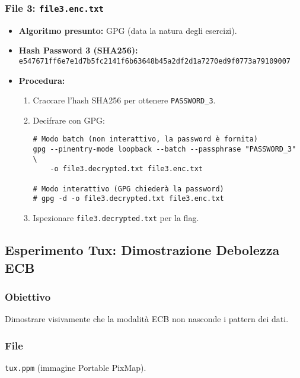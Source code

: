 \subsubsection{File 3: \texttt{file3.enc.txt}}
\begin{itemize}
    \item \textbf{Algoritmo presunto:} GPG (data la natura degli esercizi).
    \item \textbf{Hash Password 3 (SHA256):} \texttt{e547671ff6e7e1d7b5fc2141f6b63648b45a2df2d1a7270ed9f0773a79109007}
    \item \textbf{Procedura:}
    \begin{enumerate}
        \item Craccare l'hash SHA256 per ottenere \texttt{PASSWORD\_3}.
        \item Decifrare con GPG:
        \begin{verbatim}
# Modo batch (non interattivo, la password è fornita)
gpg --pinentry-mode loopback --batch --passphrase "PASSWORD_3" \
    -o file3.decrypted.txt file3.enc.txt

# Modo interattivo (GPG chiederà la password)
# gpg -d -o file3.decrypted.txt file3.enc.txt
        \end{verbatim}
        \item Ispezionare \texttt{file3.decrypted.txt} per la flag.
    \end{enumerate}
\end{itemize}

\subsection{Esperimento Tux: Dimostrazione Debolezza ECB}
\subsubsection{Obiettivo}
Dimostrare visivamente che la modalità ECB non nasconde i pattern dei dati.
\subsubsection{File}
\texttt{tux.ppm} (immagine Portable PixMap).

